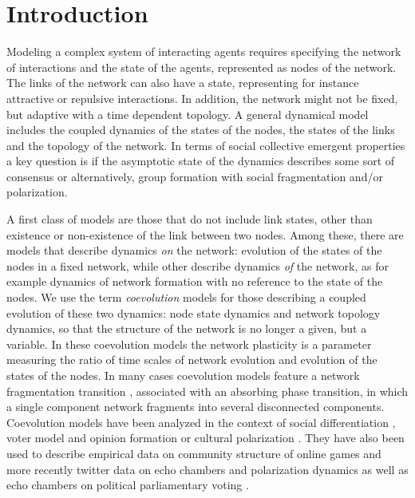 \documentclass[aps,pre,notitlepage]{revtex4-1}
\begin{document}
\section*{Introduction}
Modeling a complex system of interacting agents requires specifying the network of interactions and the state of the agents, represented as nodes of the network. The links of the network can also have a state, representing for instance attractive or repulsive interactions. In addition, the network might not be fixed, but adaptive with a time dependent topology. A general dynamical model includes the coupled dynamics of the states of the nodes, the states of the links and the topology of the network. In terms of social collective emergent properties a key question is if the asymptotic state of the dynamics describes some sort of consensus or alternatively, group formation with social fragmentation and/or polarization.

A first class of models are those that do not include link states, other than existence or non-existence of the link between two nodes. Among these, there are models that describe dynamics \emph{on} the network: evolution of the states of the nodes in a fixed network, while other describe dynamics \emph{of} the network, as for example dynamics of network formation with no reference to the state of the nodes. We use the term \emph{coevolution} models \cite{zimmermann2001cooperation,zimmermann2004coevolution} for those describing a coupled evolution of these two dynamics: node state dynamics and network topology dynamics, so that the structure of the network is no longer a given, but a variable. In these coevolution models the network plasticity is a parameter measuring the ratio of time scales of network evolution and evolution of the states of the nodes. In many cases coevolution models feature a network fragmentation transition \cite{vazquez2008generic,diakonova2014absorbing}, associated with an absorbing phase transition, in which a single component network fragments into several disconnected components. Coevolution models have been analyzed in the context of social differentiation \cite{eguiluz2005cooperation}, voter model and opinion formation \cite{vazquez2008generic,holme2006nonequilibrium,min2017fragmentation,min2019multilayer} or cultural polarization \cite{centola2007homophily}. They have also been used to describe empirical data on community structure of online games \cite{klimek2016dynamical} and more recently twitter data on echo chambers and polarization dynamics \cite{baumann2020modeling} as well as echo chambers on political parliamentary voting \cite{evans2018opinion}.
\end{document}
